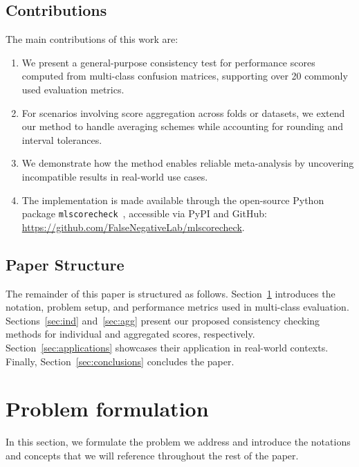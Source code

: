 \documentclass[3p, times]{elsarticle}
\begin{document}
\subsection*{Contributions}

The main contributions of this work are:
\begin{enumerate}
    \item We present a general-purpose consistency test for performance scores computed from multi-class confusion matrices, supporting over 20 commonly used evaluation metrics.
    \item For scenarios involving score aggregation across folds or datasets, we extend our method to handle averaging schemes while accounting for rounding and interval tolerances.
    \item We demonstrate how the method enables reliable meta-analysis by uncovering incompatible results in real-world use cases.
    \item The implementation is made available through the open-source Python package \texttt{mlscorecheck}~\cite{mlscorecheck}, accessible via PyPI and GitHub: \url{https://github.com/FalseNegativeLab/mlscorecheck}.
\end{enumerate}

\subsection*{Paper Structure}

The remainder of this paper is structured as follows. Section~\ref{sec:problem} introduces the notation, problem setup, and performance metrics used in multi-class evaluation. Sections~\ref{sec:ind} and~\ref{sec:agg} present our proposed consistency checking methods for individual and aggregated scores, respectively. Section~\ref{sec:applications} showcases their application in real-world contexts. Finally, Section~\ref{sec:conclusions} concludes the paper.


\section{Problem formulation}
\label{sec:problem}

In this section, we formulate the problem we address and introduce the notations and concepts that we will reference throughout the rest of the paper.
\end{document}
